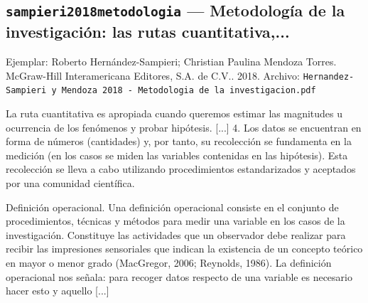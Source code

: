 \documentclass[11pt,a4paper]{article}
\newcommand{\campo}[1]{\textcolor{gris}{\footnotesize #1}}
\begin{document}
\subsection{\texttt{sampieri2018metodologia} --- Metodología de la investigación: las rutas cuantitativa,...}
{\footnotesize\campo{Ejemplar:} Roberto Hernández-Sampieri; Christian Paulina Mendoza Torres. McGraw-Hill Interamericana Editores, S.A. de C.V.. 2018. \campo{Archivo:} \texttt{Hernandez-Sampieri y Mendoza 2018 - Metodologia de la investigacion.pdf}\par}\vspace{4pt}
\vspace{3pt}\noindent{\small\textbf{p.\ 6} \quad \campo{El trabajo tiene «enfoque cuantitativo en su fase de verificación y validación», entendido como establecer la calidad del artefacto «midiendo errores numéricos, tensiones, desplazamientos y tasas de convergencia frente a referencias de exactitud conocida» --- tesis/capitulos/02b\_diseno\_metodologico.tex:4 (cita conjunta...}}\par
\begin{pasaje}\footnotesize La ruta cuantitativa es apropiada cuando queremos estimar las magnitudes u ocurrencia de los fenómenos y probar hipótesis. [...] 4. Los datos se encuentran en forma de números (cantidades) y, por tanto, su recolección se fundamenta en la medición (en los casos se miden las variables contenidas en las hipótesis). Esta recolección se lleva a cabo utilizando procedimientos estandarizados y aceptados por una comunidad científica.\end{pasaje}
\vspace{3pt}\noindent{\small\textbf{p.\ 137} \quad \campo{«La tabla operacionaliza las variables del estudio, es decir, especifica para cada una las operaciones concretas con que se la mide» --- definición de operacionalización de variables. tesis/capitulos/02b\_diseno\_metodologico.tex:21 (sin localizador)}}\par
\begin{pasaje}\footnotesize Definición operacional. Una definición operacional consiste en el conjunto de procedimientos, técnicas y métodos para medir una variable en los casos de la investigación. Constituye las actividades que un observador debe realizar para recibir las impresiones sensoriales que indican la existencia de un concepto teórico en mayor o menor grado (MacGregor, 2006; Reynolds, 1986). La definición operacional nos señala: para recoger datos respecto de una variable es necesario hacer esto y aquello [...]\end{pasaje}
\end{document}

